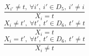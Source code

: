 $$\frac{X_{i'} \neq t,~\forall i',~i' \in D_{5},~i' \neq i}{X_{i}=t}$$ $$\frac{X_{i} \neq t',~\forall t',~t' \in D_{6},~t' \neq t}{X_{i}=t}$$ $$\frac{X_{i}=t',~\forall t',~t' \in D_{6},~t' \neq t}{X_{i} \neq t}$$ 